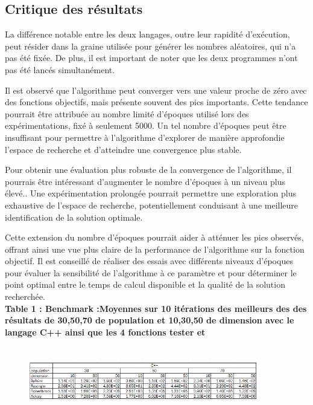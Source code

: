 \documentclass[conference]{IEEEtran}
\begin{document}
\subsection{Critique des résultats}

La différence notable entre les deux langages, outre leur rapidité d'exécution, peut résider dans la graine utilisée pour générer les nombres aléatoires, qui n'a pas été fixée. De plus, il est important de noter que les deux programmes n'ont pas été lancés simultanément.


Il est observé que l'algorithme peut converger vers une valeur proche de zéro avec des fonctions objectifs, mais présente souvent des pics importants. Cette tendance pourrait être attribuée au nombre limité d'époques utilisé lors des expérimentations, fixé à seulement 5000. Un tel nombre d'époques peut être insuffisant pour permettre à l'algorithme d'explorer de manière approfondie l'espace de recherche et d'atteindre une convergence plus stable.

Pour obtenir une évaluation plus robuste de la convergence de l'algorithme, il pourrais être intéressant d'augmenter le nombre d'époques à un niveau plus élevé.. Une expérimentation prolongée pourrait permettre une exploration plus exhaustive de l'espace de recherche, potentiellement conduisant à une meilleure identification de la solution optimale.

Cette extension du nombre d'époques pourrait aider à atténuer les pics observés, offrant ainsi une vue plus claire de la performance de l'algorithme sur la fonction objectif. Il est conseillé de réaliser des essais avec différents niveaux d'époques pour évaluer la sensibilité de l'algorithme à ce paramètre et pour déterminer le point optimal entre le temps de calcul disponible et la qualité de la solution recherchée.\\

\textbf{Table 1  : Benchmark :Moyennes sur 10 itérations des meilleurs des des résultats de 30,50,70 de population et 10,30,50 de dimension avec le langage C++ ainsi que les 4 fonctions tester et }

\begin{figure}[H]
  \centering
  \includegraphics[width=10cm , height =3cm]{tabC.png}
  
\end{figure}
\newpage
\end{document}

